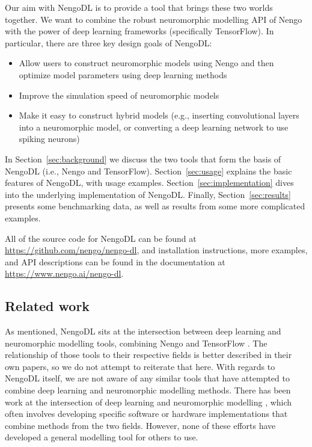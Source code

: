 \documentclass{article}
\begin{document}
Our aim with NengoDL is to provide a tool that brings these two worlds together.  We want to combine the robust neuromorphic modelling API of Nengo with the power of deep learning frameworks (specifically TensorFlow).  In particular, there are three key design goals of NengoDL:

\begin{itemize}
\item Allow users to construct neuromorphic models using Nengo and then optimize model parameters using deep learning methods
\item Improve the simulation speed of neuromorphic models
\item Make it easy to construct hybrid models (e.g., inserting convolutional layers into a neuromorphic model, or converting a deep learning network to use spiking neurons)
\end{itemize}

In Section~\ref{sec:background} we discuss the two tools that form the basis of NengoDL (i.e., Nengo and TensorFlow).  Section~\ref{sec:usage} explains the basic features of NengoDL, with usage examples.  Section~\ref{sec:implementation} dives into the underlying implementation of NengoDL.  Finally, Section~\ref{sec:results} presents some benchmarking data, as well as results from some more complicated examples.

All of the source code for NengoDL can be found at \url{https://github.com/nengo/nengo-dl}, and installation instructions, more examples, and API descriptions can be found in the documentation at \url{https://www.nengo.ai/nengo-dl}.

\subsection{Related work}

As mentioned, NengoDL sits at the intersection between deep learning and neuromorphic modelling tools, combining Nengo \citep{Bekolay2014} and TensorFlow \citep{Abadi2016}.  The relationship of those tools to their respective fields is better described in their own papers, so we do not attempt to reiterate that here.  With regards to NengoDL itself, we are not aware of any similar tools that have attempted to combine deep learning and neuromorphic modelling methods.  There has been work at the intersection of deep learning and neuromorphic modelling \citep[e.g.,][]{Esser2015,Hunsberger2015,Kriegeskorte2015,Yamins2016,Lee2016}, which often involves developing specific software or hardware implementations that combine methods from the two fields. However, none of these efforts have developed a general modelling tool for others to use.
\end{document}
